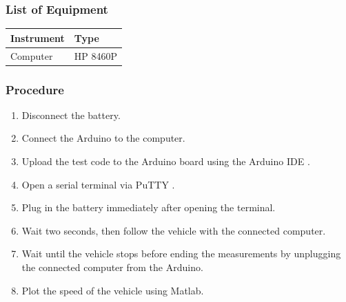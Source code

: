 \subsubsection{List of Equipment}

\begin{table}[H]
\begin{tabular}{|p{10cm}|p{4cm}|}
\hline%
  \textbf{Instrument}                     &  \textbf{Type}       \\
\hline%
  Computer                                &  HP 8460P    \\
\hline %
\end{tabular}
\end{table}

\subsubsection{Procedure}

\begin{enumerate}
  \item Disconnect the battery.
  \item Connect the Arduino to the computer.
  \item Upload the test code to the Arduino board using the Arduino IDE  \cite{ArduinoIDE}.
  \item Open a serial terminal via PuTTY \cite{PuTTY}.
  \item Plug in the battery immediately after opening the terminal.
  \item Wait two seconds, then follow the vehicle with the connected computer.
  \item Wait until the vehicle stops before ending the measurements by unplugging the connected computer from the Arduino.
  \item Plot the speed of the vehicle using Matlab.
\end{enumerate}
